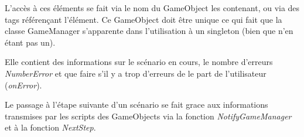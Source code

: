 L'accès à ces éléments se fait via le nom du GameObject les contenant, ou via des tags référençant l'élément. Ce GameObject doit être unique ce qui fait que la classe GameManager s'apparente dans l'utilisation à un singleton (bien que n'en étant pas un).

Elle contient des informations sur le scénario en cours, le nombre d'erreurs \textit{NumberError} et que faire s'il y a trop d'erreurs de le part de l'utilisateur (\textit{onError}).

Le passage à l'étape suivante d'un scénario se fait grace aux informations transmises par les scripts des GameObjects via la fonction \textit{NotifyGameManager} et à la fonction \textit{NextStep}.
